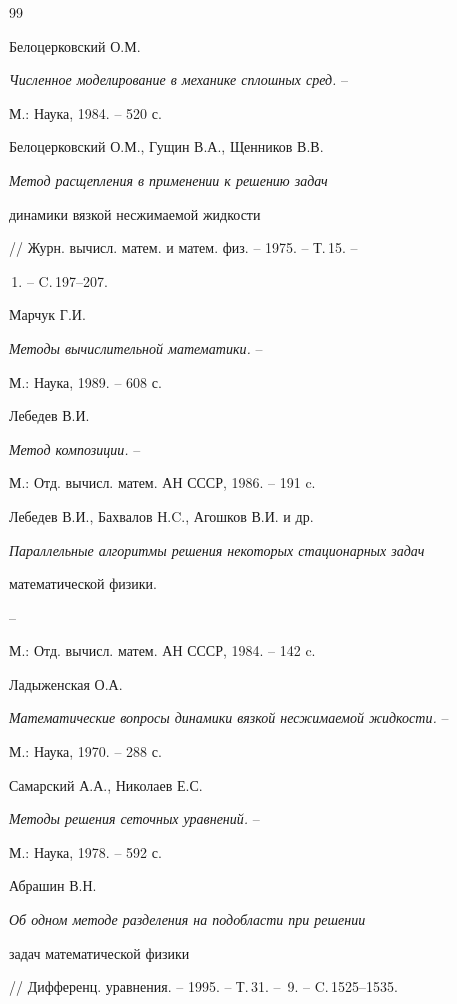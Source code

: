 \begin{thebibliography}{99}


Белоцерковский О.М.


{\it Численное моделирование в механике сплошных сред.} --


М.: Наука, 1984. -- 520 с.




Белоцерковский О.М., Гущин В.А., Щенников В.В.


{\it Метод расщепления в применении к решению задач


динамики вязкой несжимаемой жидкости}


// Журн. вычисл. матем. и матем. физ. -- 1975. -- Т.\,15. --


\No\,1. -- C.\,197--207.




Марчук Г.И.


{\it Методы вычислительной математики.} --


М.: Наука, 1989. -- 608 с.




Лебедев В.И.


{\it Метод композиции.} --


М.: Отд. вычисл. матем. АН СССР, 1986. -- 191 c.




Лебедев В.И., Бахвалов Н.C., Агошков В.И. и др.


{\it Параллельные алгоритмы решения некоторых стационарных задач


математической физики.} --


М.: Отд. вычисл. матем. АН СССР, 1984. -- 142 c.




Ладыженская О.А.


{\it Математические вопросы динамики вязкой несжимаемой жидкости.} --


М.: Наука, 1970. -- 288 с.




Самарский А.А., Николаев Е.С.


{\it Методы решения сеточных уравнений.} --


М.: Наука, 1978. -- 592 с.




Абрашин В.Н.


{\it Об одном методе разделения на подобласти при решении


задач математической физики}


// Дифференц. уравнения. -- 1995. -- Т.\,31. -- \No\,9. -- C.\,1525--1535.



\end{thebibliography}
